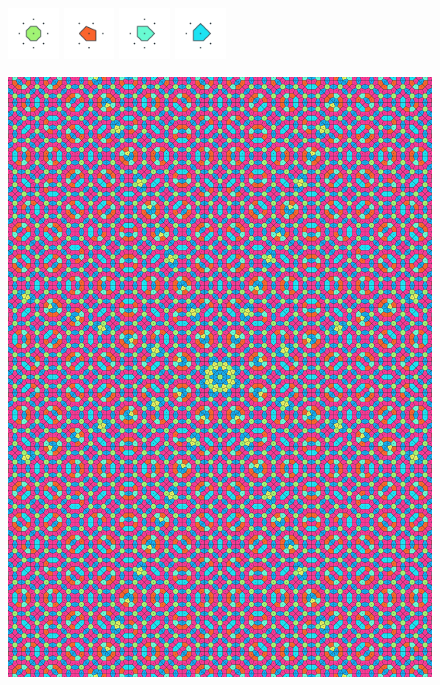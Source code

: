 \documentclass[text.tex]{subfiles}
\begin{document}
\begin{figure}[h!]
\includegraphics[width=0.12\textwidth]{img/results/octagon/octagon_141421_(-1_1alpha_1)_005.pdf}
\includegraphics[width=0.12\textwidth]{img/results/octagon/octagon_141421_(-1_1alpha_1)_006.pdf}
\includegraphics[width=0.12\textwidth]{img/results/octagon/octagon_141421_(-1_1alpha_1)_007.pdf}
\includegraphics[width=0.12\textwidth]{img/results/octagon/octagon_141421_(-1_1alpha_1)_008.pdf}
\end{figure}

\begin{figure}[h!]
\centering
\includegraphics[width=1\textwidth]{img/results/octagon/quasi_polygon-octagon_141421_(-1_1alpha_1).pdf}
\end{figure}
\end{document}
